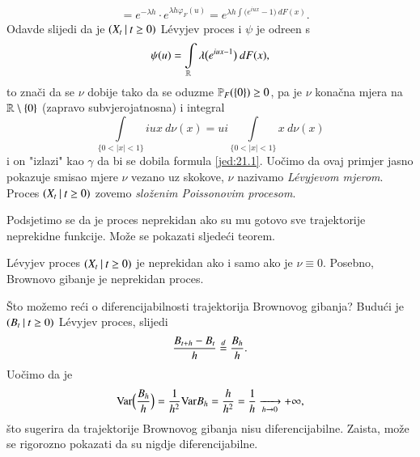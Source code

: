 \begin{pr}
\begin{equation}
\begin{aligned}
            &= e^{-\lambda h} \cdot e^{\lambda h \varphi_F (u)} = e^{\lambda h \int \big( e^{i u x} - 1 \big) \: d F (x)}.
        \end{aligned}
    \end{equation}
    Odavde slijedi da je $({X_t} \: | \: {t \geq 0})$ L\' evyjev proces i $\psi$ je odre\dj en s
    \begin{equation}    \label{jed:21.13}
        \psi (u) = \int\limits_{\mathbb{R}} \lambda \big( e^{i u x - 1} \big) \: d F (x),
    \end{equation}
    to zna\v ci da se $\nu$ dobije tako da se oduzme $\mathbb{P}_F (\{0\}) \geq 0$, pa je $\nu$ kona\v cna mjera na $\mathbb{R} \setminus \{0\}$ (zapravo subvjerojatnosna) i integral
    \begin{equation*}
        \int\limits_{\{ 0 < |x| < 1 \}} i u x \: d \nu (x) = u i \int\limits_{\{ 0 < |x| < 1 \}} x \: d \nu (x)
    \end{equation*}
    i on "izlazi" kao $\gamma$ da bi se dobila formula \eqref{jed:21.1}.
    Uo\v cimo da ovaj primjer jasno pokazuje smisao mjere $\nu$ vezano uz skokove, $\nu$ nazivamo \emph{L\' evyjevom mjerom}.
    Proces $({X_t} \: | \: {t \geq 0})$ zovemo \emph{slo\v zenim Poissonovim procesom}.
\end{pr}

Podsjetimo se da je proces neprekidan ako su mu gotovo sve trajektorije neprekidne funkcije.
Mo\v ze se pokazati sljede\' ci teorem.

\begin{tm}  \label{tm:21.14}
    L\' evyjev proces $({X_t} \: | \: {t \geq 0})$ je neprekidan ako i samo ako je $\nu \equiv 0$.
    Posebno, Brownovo gibanje je neprekidan proces.
\end{tm}

\begin{nap} \label{nap:21.15}
    \v Sto mo\v zemo re\' ci o diferencijabilnosti trajektorija Brownovog gibanja?
    Budu\' ci je $({B_t} \: | \: {t \geq 0})$ L\' evyjev proces, slijedi
    \begin{equation*}
        \frac{B_{t + h} - B_t}{h} \overset{d}{=} \frac{B_h}{h}.
    \end{equation*}
    Uo\v cimo da je
    \begin{equation*}
        \mathrm{Var} \Big( \frac{B_h}{h} \Big) = \frac{1}{h^2} \mathrm{Var} B_h = \frac{h}{h^2} = \frac{1}{h} \xrightarrow[h \to 0]{} +\infty,
    \end{equation*}
    \v sto sugerira da trajektorije Brownovog gibanja nisu diferencijabilne.
    Zaista, mo\v ze se rigorozno pokazati da su nigdje diferencijabilne.
\end{nap}

